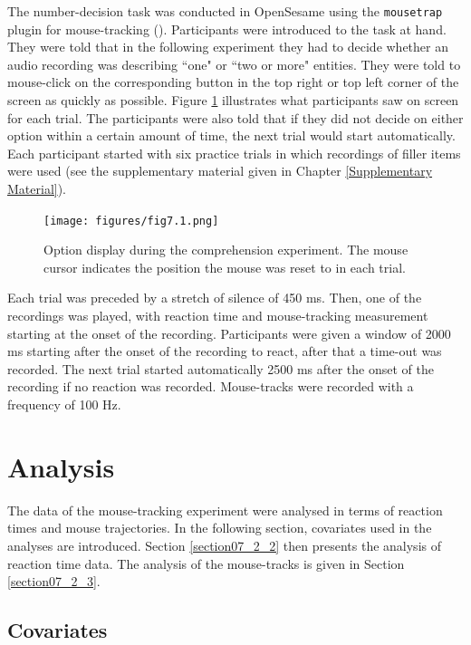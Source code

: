 The number-decision task was conducted in OpenSesame using the \texttt{mousetrap} plugin for mouse-tracking (\cite{Kieslich2017}). Participants were introduced to the task at hand. They were told that in the following experiment they had to decide whether an audio recording was describing ``one" or ``two or more" entities. They were told to mouse-click on the corresponding button in the top right or top left corner of the screen as quickly as possible. Figure \ref{fig:7_1} illustrates what participants saw on screen for each trial. The participants were also told that if they did not decide on either option within a certain amount of time, the next trial would start automatically. Each participant started with six practice trials in which recordings of filler items were used (see the supplementary material given in Chapter \ref{Supplementary Material}).

\begin{figure}
    \centering
    \texttt{[image: figures/fig7.1.png]}
    \caption{Option display during the comprehension experiment. The mouse cursor indicates the position the mouse was reset to in each trial.}
    \label{fig:7_1}
\end{figure}

Each trial was preceded by a stretch of silence of 450 ms. Then, one of the recordings was played, with reaction time and mouse-tracking measurement starting at the onset of the recording. Participants were given a window of 2000 ms starting after the onset of the recording to react, after that a time-out was recorded. The next trial started automatically 2500 ms after the onset of the recording if no reaction was recorded. Mouse-tracks were recorded with a frequency of 100 Hz.

\section{Analysis}\label{section07_2}

The data of the mouse-tracking experiment were analysed in terms of reaction times and mouse trajectories. In the following section, covariates used in the analyses are introduced. Section \ref{section07_2_2} then presents the analysis of reaction time data. The analysis of the mouse-tracks is given in Section \ref{section07_2_3}.

\subsection{Covariates}\label{section07_2_1}

